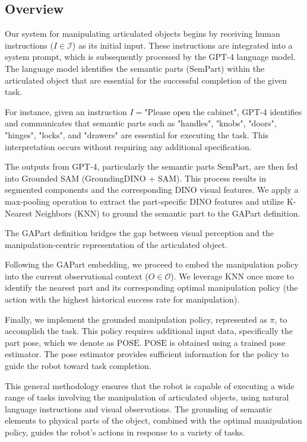 \documentclass{article}
\begin{document}
\subsection{Overview}
Our system for manipulating articulated objects begins by receiving human instructions ($I \in \mathcal{I}$) as its initial input. These instructions are integrated into a system prompt, which is subsequently processed by the GPT-4 language model. The language model identifies the semantic parts ($\text{SemPart}$) within the articulated object that are essential for the successful completion of the given task.

For instance, given an instruction $I = \text{"Please open the cabinet"}$, GPT-4 identifies and communicates that semantic parts such as "handles", "knobs", "doors", "hinges", "locks", and "drawers" are essential for executing the task. This interpretation occurs without requiring any additional specification.

The outputs from GPT-4, particularly the semantic parts $\text{SemPart}$, are then fed into Grounded SAM (GroundingDINO + SAM)\cite{kirillov2023segany,liu2023grounding}. This process results in segmented components and the corresponding DINO visual features. We apply a max-pooling operation to extract the part-specific DINO features and utilize K-Nearest Neighbors (KNN) to ground the semantic part to the GAPart definition.

The GAPart definition\cite{geng2022gapartnet} bridges the gap between visual perception and the manipulation-centric representation of the articulated object.

Following the GAPart embedding, we proceed to embed the manipulation policy into the current observational context ($O \in \mathcal{O}$). We leverage KNN once more to identify the nearest part and its corresponding optimal manipulation policy (the action with the highest historical success rate for manipulation).

Finally, we implement the grounded manipulation policy, represented as $\pi$, to accomplish the task. This policy requires additional input data, specifically the part pose, which we denote as $\text{POSE}$. $\text{POSE}$ is obtained using a trained pose estimator. The pose estimator provides sufficient information for the policy to guide the robot toward task completion.

This general methodology ensures that the robot is capable of executing a wide range of tasks involving the manipulation of articulated objects, using natural language instructions and visual observations. The grounding of semantic elements to physical parts of the object, combined with the optimal manipulation policy, guides the robot's actions in response to a variety of tasks.
\end{document}
